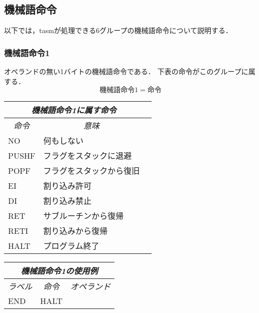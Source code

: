 \subsection{機械語命令}
以下では，tasmが処理できる6グループの機械語命令について説明する．

\subsubsection{機械語命令1}
オペランドの無い1バイトの機械語命令である．
下表の命令がこのグループに属する．
\[ 機械語命令1 = 命令 \]
\begin{center}
\begin{tabular}{lll}
\hline
\multicolumn{2}{c}{\it 機械語命令1に属す命令} \\
\hline
\multicolumn{1}{c}{\it 命令} & \multicolumn{1}{c}{\it 意味} \\
NO & 何もしない \\
PUSHF & フラグをスタックに退避 \\
POPF & フラグをスタックから復旧 \\
EI & 割り込み許可 \\
DI & 割り込み禁止 \\
RET & サブルーチンから復帰 \\
RETI & 割り込みから復帰 \\
HALT & プログラム終了 \\
\hline
\end{tabular}
\end{center}
\vspace{0.2cm}

\begin{center}
\tt\begin{tabular}{lll}
\hline
\multicolumn{3}{c}{\it 機械語命令1の使用例} \\
\hline
\multicolumn{1}{c}{\it ラベル} & 
        \multicolumn{1}{c}{\it 命令} & \multicolumn{1}{c}{\it オペランド} \\
END  & HALT &  \\
\hline
\end{tabular}
\end{center}
\vspace{0.2cm}

